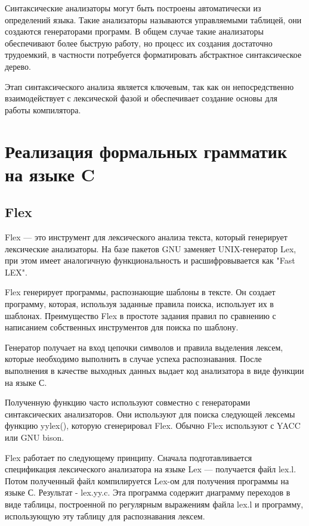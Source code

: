 \documentclass[bachelor, och, coursework, times]{SCWorks}
\begin{document}
Синтаксические анализаторы могут быть построены автоматически из определений языка. Такие анализаторы называются управляемыми таблицей, они создаются генераторами программ. В общем случае такие анализаторы обеспечивают более быструю работу, но процесс их создания достаточно трудоемкий, в частности потребуется форматировать абстрактное синтаксическое дерево.

Этап синтаксического анализа является ключевым, так как он непосредственно взаимодействует с лексической фазой и обеспечивает создание основы для работы компилятора.~\cite{Compilers}

\section{Реализация формальных грамматик на языке C}
\subsection{Flex}

Flex --- это инструмент для лексического анализа текста, который генерирует лексические анализаторы. На базе пакетов GNU заменяет UNIX-генератор Lex, при этом имеет аналогичную функциональность и расшифровывается как "Fast LEX".

Flex генерирует программы, распознающие шаблоны в тексте. Он создает программу, которая, используя заданные правила поиска, использует их в шаблонах. Преимущество Flex в простоте задания правил по сравнению с написанием собственных инструментов для поиска по шаблону.

Генератор получает на вход цепочки символов и правила выделения лексем, которые необходимо выполнить в случае успеха распознавания. После выполнения в качестве выходных данных выдает код анализатора в виде функции на языке С.

Полученную функцию часто используют совместно с генераторами синтаксических анализаторов. Они используют для поиска следующей лексемы функцию yylex(), которую сгенерировал Flex. Обычно Flex используют с YACC или GNU bison. 

Flex работает по следующему принципу. Сначала подготавливается спецификация лексического анализатора на языке Lex --- получается файл lex.l. Потом полученный файл компилируется Lex-ом для получения программы на языке С. Результат - lex.yy.c. Эта программа содержит диаграмму переходов в виде таблицы, построенной по регулярным выражениям файла lex.l и программу, использующую эту таблицу для распознавания лексем.
\end{document}
